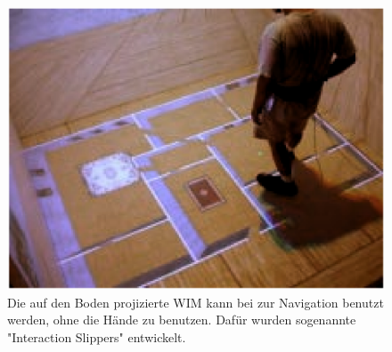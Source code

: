 \begin{figure}[h]
  \centering
  \includegraphics[width=\textwidth]{images/step_wim.png}
  \caption{Die auf den Boden projizierte WIM kann bei \cite{LaViola2004Hands-freeEnvironments} zur Navigation benutzt werden, ohne die Hände zu benutzen. Dafür wurden sogenannte "Interaction Slippers" entwickelt.}
  \label{fig:todo}
\end{figure}

